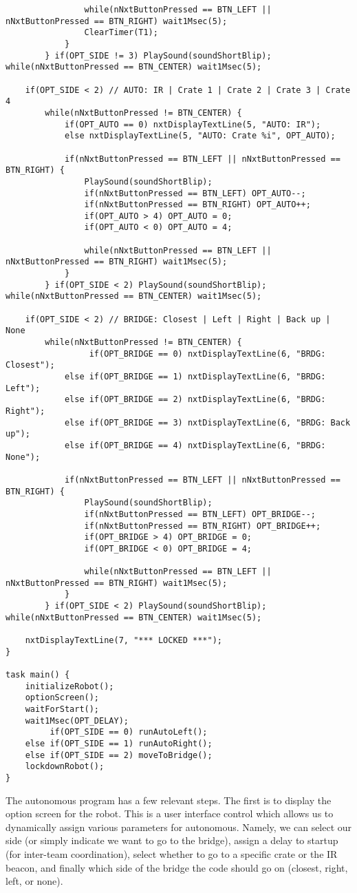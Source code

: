 \begin{lstlisting}
				while(nNxtButtonPressed == BTN_LEFT || nNxtButtonPressed == BTN_RIGHT) wait1Msec(5);
				ClearTimer(T1);
			}
		} if(OPT_SIDE != 3) PlaySound(soundShortBlip); while(nNxtButtonPressed == BTN_CENTER) wait1Msec(5);

	if(OPT_SIDE < 2) // AUTO: IR | Crate 1 | Crate 2 | Crate 3 | Crate 4
		while(nNxtButtonPressed != BTN_CENTER) {
			if(OPT_AUTO == 0) nxtDisplayTextLine(5, "AUTO: IR");
			else nxtDisplayTextLine(5, "AUTO: Crate %i", OPT_AUTO);

			if(nNxtButtonPressed == BTN_LEFT || nNxtButtonPressed == BTN_RIGHT) {
				PlaySound(soundShortBlip);
				if(nNxtButtonPressed == BTN_LEFT) OPT_AUTO--;
				if(nNxtButtonPressed == BTN_RIGHT) OPT_AUTO++;
				if(OPT_AUTO > 4) OPT_AUTO = 0;
				if(OPT_AUTO < 0) OPT_AUTO = 4;

				while(nNxtButtonPressed == BTN_LEFT || nNxtButtonPressed == BTN_RIGHT) wait1Msec(5);
			}
		} if(OPT_SIDE < 2) PlaySound(soundShortBlip); while(nNxtButtonPressed == BTN_CENTER) wait1Msec(5);

	if(OPT_SIDE < 2) // BRIDGE: Closest | Left | Right | Back up | None
		while(nNxtButtonPressed != BTN_CENTER) {
			     if(OPT_BRIDGE == 0) nxtDisplayTextLine(6, "BRDG: Closest");
			else if(OPT_BRIDGE == 1) nxtDisplayTextLine(6, "BRDG: Left");
			else if(OPT_BRIDGE == 2) nxtDisplayTextLine(6, "BRDG: Right");
			else if(OPT_BRIDGE == 3) nxtDisplayTextLine(6, "BRDG: Back up");
			else if(OPT_BRIDGE == 4) nxtDisplayTextLine(6, "BRDG: None");

			if(nNxtButtonPressed == BTN_LEFT || nNxtButtonPressed == BTN_RIGHT) {
				PlaySound(soundShortBlip);
				if(nNxtButtonPressed == BTN_LEFT) OPT_BRIDGE--;
				if(nNxtButtonPressed == BTN_RIGHT) OPT_BRIDGE++;
				if(OPT_BRIDGE > 4) OPT_BRIDGE = 0;
				if(OPT_BRIDGE < 0) OPT_BRIDGE = 4;

				while(nNxtButtonPressed == BTN_LEFT || nNxtButtonPressed == BTN_RIGHT) wait1Msec(5);
			}
		} if(OPT_SIDE < 2) PlaySound(soundShortBlip); while(nNxtButtonPressed == BTN_CENTER) wait1Msec(5);

	nxtDisplayTextLine(7, "*** LOCKED ***");
}

task main() {
	initializeRobot();
	optionScreen();
	waitForStart();
	wait1Msec(OPT_DELAY);
	     if(OPT_SIDE == 0) runAutoLeft();
	else if(OPT_SIDE == 1) runAutoRight();
	else if(OPT_SIDE == 2) moveToBridge();
	lockdownRobot();
}
\end{lstlisting}

The autonomous program has a few relevant steps. The first is to display the option screen for the robot. This is a user interface control which allows us to dynamically assign various parameters for autonomous. Namely, we can select our side (or simply indicate we want to go to the bridge), assign a delay to startup (for inter-team coordination), select whether to go to a specific crate or the IR beacon, and finally which side of the bridge the code should go on (closest, right, left, or none).

